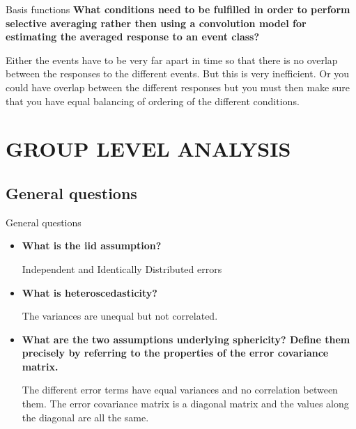 \documentclass{beamer}
\begin{document}
\begin{frame}{Basis functions}
\textbf{What conditions need to be fulfilled in order to perform selective averaging rather then using a convolution model for estimating the averaged response to an event class?}

\smallskip 
Either the events have to be very far apart in time so that there is no overlap between the responses to the different events. But this is very inefficient. \linebreak
Or you could have overlap between the different responses but you must then make sure that you have equal balancing of ordering of the different conditions. 
\end{frame}



    

\section{GROUP LEVEL ANALYSIS}    
 
\subsection[General questions]{General questions}

\begin{frame}{General questions}
  \begin{itemize} 
    \item \textbf{What is the iid assumption?}

\smallskip 
Independent and Identically Distributed errors

\bigskip
    \item \textbf{What is heteroscedasticity?}

\smallskip 
The variances are unequal but not correlated.

\bigskip
    \item \textbf{What are the two assumptions underlying sphericity? Define them precisely by referring to the properties of the error covariance matrix.}

\smallskip  
The different error terms have equal variances and no correlation between them. The error covariance matrix is a diagonal matrix and the values along the diagonal are all the same.
  \end{itemize}
\end{frame}
\end{document}
